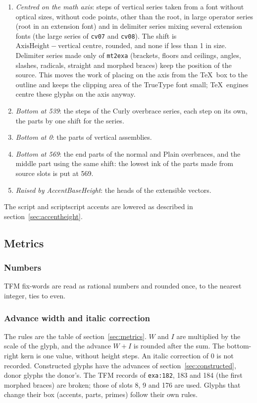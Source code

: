 \documentclass[10pt]{article}
\newcommand\file[1]{\texttt{#1}}
\newcommand\feat[1]{\texttt{#1}}
\newcommand\slot[2]{\texttt{#1:#2}}
\begin{document}
\begin{enumerate}
\item \emph{Centred on the math axis}: steps of vertical series taken
  from a font without optical sizes, without code points, other than
  the root, in large operator series (root in an extension font) and in
  delimiter series mixing several extension fonts (the large series of
  \feat{cv07} and \feat{cv08}).  The shift is $\mathrm{AxisHeight} -
  \text{vertical centre}$, rounded, and none if less than 1 in size.
  Delimiter series made only of \file{mt2exa} (brackets, floors and
  ceilings, angles, slashes, radicals, straight and morphed braces)
  keep the position of the source.  This moves the work of placing on
  the axis from the \TeX\ box to the outline and keeps the clipping
  area of the TrueType font small; \TeX\ engines centre these glyphs
  on the axis anyway.
\item \emph{Bottom at 539}: the steps of the Curly overbrace series,
  each step on its own, the parts by one shift for the series.
\item \emph{Bottom at 0}: the parts of vertical assemblies.
\item \emph{Bottom at 569}: the end parts of the normal and Plain
  overbraces, and the middle part using the same shift: the lowest ink
  of the parts made from source slots is put at 569.
\item \emph{Raised by AccentBaseHeight}: the heads of the
  extensible vectors.
\end{enumerate}

The script and scriptscript accents are lowered as described in
section~\ref{sec:accentheight}.

\subsection{Metrics}\label{app:metrics}
\subsubsection{Numbers}

TFM fix-words are read as rational numbers and rounded once, to the
nearest integer, ties to even.

\subsubsection{Advance width and italic correction}

The rules are the table of section~\ref{sec:metrics}.  $W$ and $I$ are
multiplied by the scale of the glyph, and the advance $W + I$ is
rounded after the sum.  The bottom-right kern is one value, without
height steps.  An italic correction of 0 is not recorded.  Constructed
glyphs have the advances of section~\ref{sec:constructed}, donor glyphs
the donor's.  The TFM records of \slot{exa}{182}, 183 and 184 (the
first morphed braces) are broken; those of slots 8, 9 and 176 are used.
Glyphs that change their box (accents, parts, primes) follow their own
rules.
\end{document}
